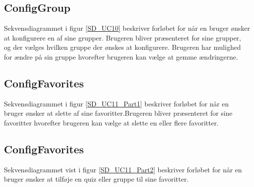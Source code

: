 
\subsection*{ConfigGroup}
Sekvensdiagrammet i figur \ref{SD_UC10} beskriver forløbet for når en bruger ønsker at konfigurere en af sine grupper. Brugeren bliver præsenteret for sine grupper, og der vælges hvilken gruppe der ønskes at konfigurere. Brugeren har mulighed for ændre på sin gruppe hvorefter brugeren kan vælge at gemme ændringerne.


\subsection*{ConfigFavorites}
Sekvensdiagrammet i figur \ref{SD_UC11_Part1} beskriver forløbet for når en bruger ønsker at slette af sine favoritter.Brugeren bliver præsenteret for sine favoritter hvorefter brugeren kan vælge at slette en eller flere favoritter.


\subsection*{ConfigFavorites}
Sekvensdiagrammet vist i figur \ref{SD_UC11_Part2} beskriver forløbet for når en bruger ønsker at tilføje en quiz eller gruppe til sine favoritter.

